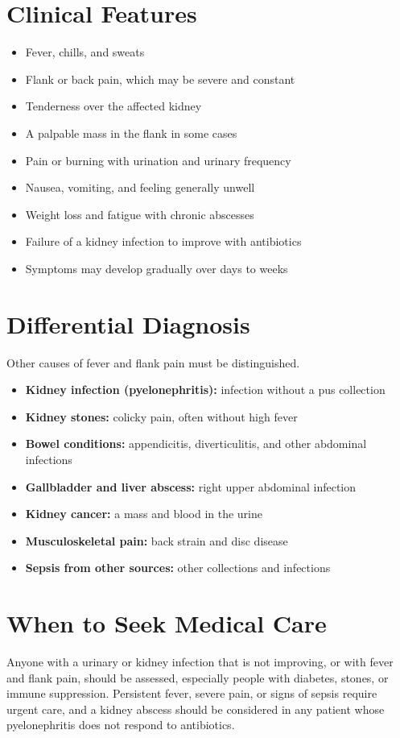 \section*{Clinical Features}
\begin{itemize}
    \item Fever, chills, and sweats
    \item Flank or back pain, which may be severe and constant
    \item Tenderness over the affected kidney
    \item A palpable mass in the flank in some cases
    \item Pain or burning with urination and urinary frequency
    \item Nausea, vomiting, and feeling generally unwell
    \item Weight loss and fatigue with chronic abscesses
    \item Failure of a kidney infection to improve with antibiotics
    \item Symptoms may develop gradually over days to weeks
\end{itemize}

\section*{Differential Diagnosis}
Other causes of fever and flank pain must be distinguished.
\begin{itemize}
    \item \textbf{Kidney infection (pyelonephritis):} infection without a pus collection
    \item \textbf{Kidney stones:} colicky pain, often without high fever
    \item \textbf{Bowel conditions:} appendicitis, diverticulitis, and other abdominal infections
    \item \textbf{Gallbladder and liver abscess:} right upper abdominal infection
    \item \textbf{Kidney cancer:} a mass and blood in the urine
    \item \textbf{Musculoskeletal pain:} back strain and disc disease
    \item \textbf{Sepsis from other sources:} other collections and infections
\end{itemize}

\section*{When to Seek Medical Care}
Anyone with a urinary or kidney infection that is not improving, or with fever and flank pain, should be assessed, especially people with diabetes, stones, or immune suppression. Persistent fever, severe pain, or signs of sepsis require urgent care, and a kidney abscess should be considered in any patient whose pyelonephritis does not respond to antibiotics.

